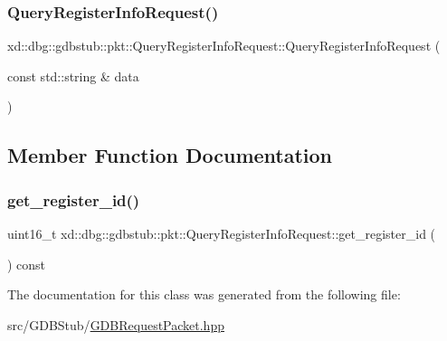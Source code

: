 \subsubsection{\texorpdfstring{Query\+Register\+Info\+Request()}{QueryRegisterInfoRequest()}}
{\footnotesize\ttfamily xd\+::dbg\+::gdbstub\+::pkt\+::\+Query\+Register\+Info\+Request\+::\+Query\+Register\+Info\+Request (\begin{DoxyParamCaption}\item[{const std\+::string \&}]{data }\end{DoxyParamCaption})\hspace{0.3cm}{\ttfamily [inline]}}



\subsection{Member Function Documentation}
\mbox{\label{classxd_1_1dbg_1_1gdbstub_1_1pkt_1_1_query_register_info_request_a270a7fa5224fd98877ffe82c6fcc882f}} 
\subsubsection{\texorpdfstring{get\+\_\+register\+\_\+id()}{get\_register\_id()}}
{\footnotesize\ttfamily uint16\+\_\+t xd\+::dbg\+::gdbstub\+::pkt\+::\+Query\+Register\+Info\+Request\+::get\+\_\+register\+\_\+id (\begin{DoxyParamCaption}{ }\end{DoxyParamCaption}) const\hspace{0.3cm}{\ttfamily [inline]}}



The documentation for this class was generated from the following file\+:\begin{DoxyCompactItemize}
\item 
src/\+G\+D\+B\+Stub/\mbox{\hyperlink{_g_d_b_request_packet_8hpp}{G\+D\+B\+Request\+Packet.\+hpp}}\end{DoxyCompactItemize}
